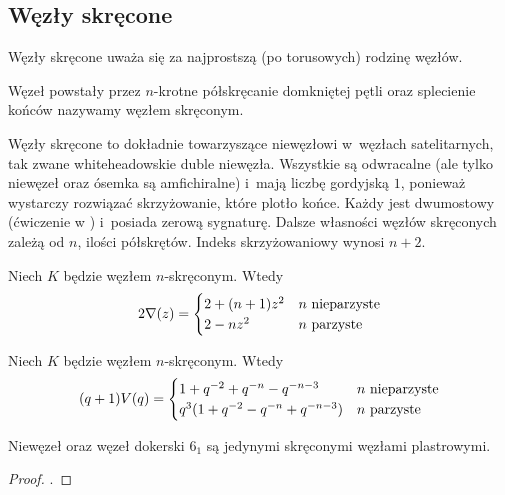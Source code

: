 \subsection{Węzły skręcone}
%

Węzły skręcone uważa się za najprostszą (po torusowych) rodzinę węzłów.

\begin{definition}
    \label{def:twist_knot}
    Węzeł powstały przez $n$-krotne półskręcanie domkniętej pętli oraz splecienie końców nazywamy węzłem skręconym.
\end{definition}

Węzły skręcone to dokładnie towarzyszące niewęzłowi w~węzłach satelitarnych, tak zwane whiteheadowskie duble niewęzła.
Wszystkie są odwracalne (ale tylko niewęzeł oraz ósemka są amfichiralne) i~mają liczbę gordyjską $1$, ponieważ wystarczy rozwiązać skrzyżowanie, które plotło końce.
%
Każdy jest dwumostowy (ćwiczenie w \cite[s. 114]{rolfsen76}) i~posiada zerową sygnaturę.
%
%
Dalsze własności węzłów skręconych zależą od $n$, ilości półskrętów.
Indeks skrzyżowaniowy wynosi $n + 2$.

\begin{proposition}
%
    Niech $K$ będzie węzłem $n$-skręconym.
    Wtedy
    \begin{equation}
    2 \nabla (z) = \begin{cases}
        2 + (n+1) z^{2} & n \mbox{ nieparzyste} \\
        2 - nz^2 & n \mbox{ parzyste}
    \end{cases}
    \end{equation}
\end{proposition}

\begin{proposition}
%
    Niech $K$ będzie węzłem $n$-skręconym.
    Wtedy
    \begin{equation}
    (q+1)V(q) = \begin{cases}
        1+q^{-2}+q^{-n}-q^{-n-3} & n \mbox{ nieparzyste} \\
        q^3(1+q^{-2}-q^{-n}+q^{-n-3}) & n \mbox{ parzyste}
    \end{cases}
    \end{equation}
\end{proposition}

\begin{proposition}
%
    Niewęzeł oraz węzeł dokerski $6_1$ są jedynymi skręconymi węzłami plastrowymi.
\end{proposition}

\begin{proof}
    \cite{casson86}.
\end{proof}

%

